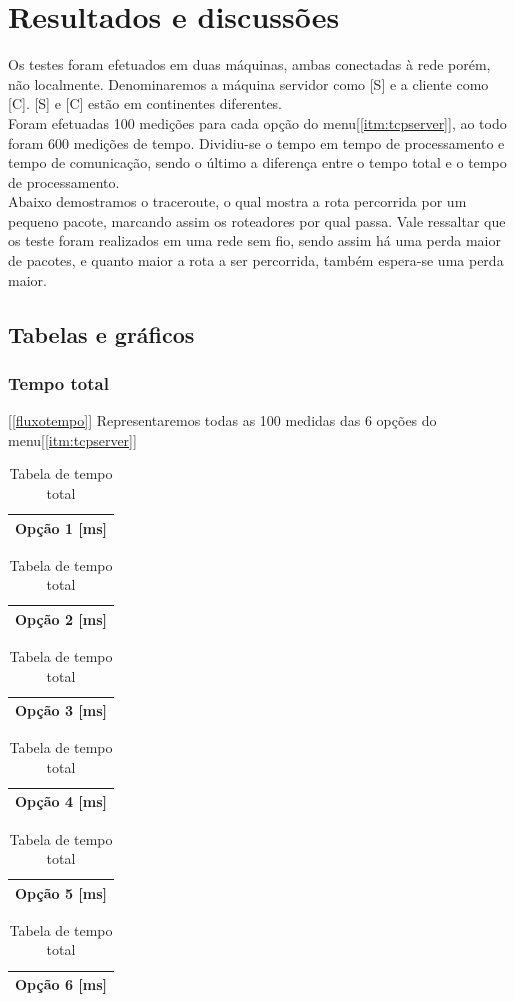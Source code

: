 \documentclass[a4paper,10pt]{article}
\begin{document}
\section{Resultados e discussões}
Os testes foram efetuados em duas máquinas, ambas conectadas à rede porém, não localmente. Denominaremos a máquina servidor como [S] e a cliente como [C]. [S] e [C] estão em continentes diferentes.
\\Foram efetuadas 100 medições para cada opção do menu[\ref{itm:tcpserver}], ao todo foram 600 medições de tempo. Dividiu-se o tempo em tempo de processamento e tempo de comunicação, sendo o último a diferença entre o tempo total e o tempo de processamento.
\\Abaixo demostramos o traceroute, o qual mostra a rota percorrida por um pequeno pacote, marcando assim os roteadores por qual passa. Vale ressaltar que os teste 
foram realizados em uma rede sem fio, sendo assim há uma perda maior de pacotes, e quanto maior a rota a ser percorrida, também espera-se uma perda maior.

\subsection{Tabelas e gráficos}
\subsubsection{Tempo total}[\ref{fluxotempo}]
Representaremos todas as 100 medidas das 6 opções do menu[\ref{itm:tcpserver}]
\begin{table}
  \tiny
  \centering
  \begin{tabular}{|c|}
    \hline
    Opção 1 [ms] \\
    \hline
        
    \hline
  \end{tabular}
  \begin{tabular}{|c|}
    \hline
    Opção 2 [ms] \\
    \hline
    
    \hline
  \end{tabular}
  \begin{tabular}{|c|}
    \hline
    Opção 3 [ms] \\
    \hline
    
    \hline
  \end{tabular}
  \begin{tabular}{|c|}
    \hline
    Opção 4 [ms] \\
    \hline
    
    \hline
  \end{tabular}
  \begin{tabular}{|c|}
    \hline
    Opção 5 [ms] \\
    \hline
    
    \hline
  \end{tabular}
  \begin{tabular}{|c|}
    \hline
    Opção 6 [ms] \\
    \hline
    
    \hline
  \end{tabular}
  \caption{Tabela de tempo total}
\end{table}
\newpage
\end{document}
